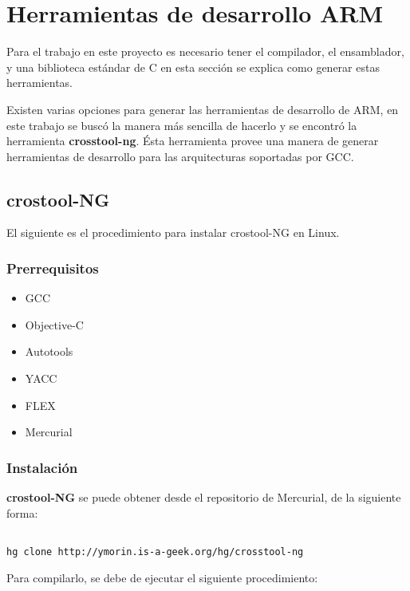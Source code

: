 \chapter{Herramientas de desarrollo ARM}\label{ch:toolchain}

Para el trabajo en este proyecto es necesario tener el compilador, el ensamblador, y una biblioteca estándar de C en esta sección se explica como generar estas herramientas.

Existen varias opciones para generar las herramientas de desarrollo de ARM, en este trabajo se buscó la manera más sencilla de hacerlo y se encontró la herramienta \textbf{crosstool-ng}. Ésta herramienta provee una manera de generar herramientas de desarrollo para las arquitecturas soportadas por \ac{GCC}.

\section{crostool-NG}

El siguiente es el procedimiento para instalar crostool-NG en Linux.

\subsection{Prerrequisitos}

\begin{itemize}
\item \ac{GCC}
\item Objective-C
\item Autotools
\item \ac{YACC}
\item \ac{FLEX}
\item Mercurial
\end{itemize}

\subsection{Instalaci\'on}

\textbf{crostool-NG} se puede obtener desde el repositorio de Mercurial, de la siguiente forma:

\begin{verbatim}

hg clone http://ymorin.is-a-geek.org/hg/crosstool-ng

\end{verbatim}

Para compilarlo, se debe de ejecutar el siguiente procedimiento:

